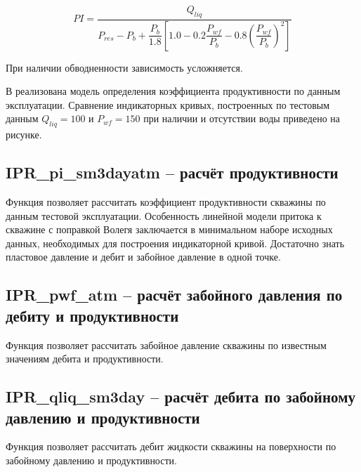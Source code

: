  \begin{equation}\label{eq_Vogel} 
 PI = \frac{Q_{liq}}{P_{res} - P_{b} + \dfrac{P_{b}}{1.8} \left[ 1.0 - 0.2  \dfrac{P_{wf}}{P_{b}}- 0.8 \left( \dfrac{P_{wf}}{P_{b}} \right)^2 \right] }   
 \end{equation}
 
 При наличии обводненности зависимость усложняется.
 
 В \unf реализована модель определения коэффициента продуктивности по данным эксплуатации. Сравнение индикаторных кривых, построенных по тестовым данным $Q_{liq} = 100$ и $P_{wf} = 150$ при наличии и отсутствии воды приведено на рисунке. 
 
 \newcommand{\IPRFile}{data/IPR_fw_data.txt}
 
 

\subsection{IPR\_pi\_sm3dayatm – расчёт продуктивности}
Функция позволяет рассчитать коэффициент продуктивности скважины по данным тестовой эксплуатации. Особенность линейной модели притока к скважине с поправкой Волегя заключается в минимальном наборе исходных данных, необходимых для построения индикаторной кривой. Достаточно знать пластовое давление и дебит и забойное давление в одной точке.



\subsection{IPR\_pwf\_atm – расчёт забойного давления по дебиту и продуктивности}
Функция позволяет рассчитать забойное давление скважины по известным значениям дебита и продуктивности.


\subsection{IPR\_qliq\_sm3day – расчёт дебита по забойному давлению и продуктивности}
Функция позволяет рассчитать дебит жидкости скважины на поверхности по забойному давлению и продуктивности.




\newpage
